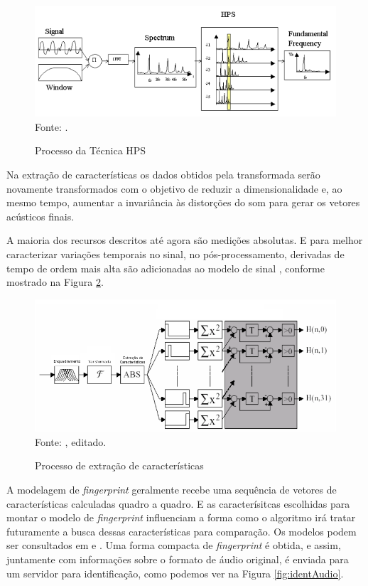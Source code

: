 \begin{figure}[!htb]
   \centering
   \caption{Processo da Técnica HPS}\label{fig:hps} 
   \includegraphics[scale=0.62]{figuras/hps.png}
   \\Fonte: \cite{santos2011}.
\end{figure}

Na extração de características os dados obtidos pela transformada serão novamente transformados com o objetivo de reduzir a dimensionalidade e, ao mesmo tempo, aumentar a invariância às distorções do som para gerar os vetores acústicos finais.

A maioria dos recursos descritos até agora são medições absolutas. E para melhor caracterizar variações temporais no sinal, no pós-processamento, derivadas de tempo de ordem mais alta são adicionadas ao modelo de sinal \cite{cano2005}, conforme mostrado na Figura \ref{fig:extCaract}.

\begin{figure}[!htb]
   \centering
   \caption{Processo de extração de características}\label{fig:extCaract} 
   \includegraphics[scale=0.47]{figuras/extCaract.png}
   \\Fonte: \cite{haitsma2002}, editado.
\end{figure}

A modelagem de \textit{fingerprint} geralmente recebe uma sequência de vetores de características calculadas quadro a quadro. E as caracterísitcas escolhidas para montar o modelo de \textit{fingerprint} influenciam a forma como o algoritmo irá tratar futuramente a busca dessas características para comparação. Os modelos podem ser consultados em \cite{cano2005} e \cite{haitsma2002}. Uma forma compacta de \textit{fingerprint} é obtida, e assim, juntamente com informações sobre o formato de áudio original, é enviada para um servidor para identificação, como podemos ver na Figura \ref{fig:identAudio}.

